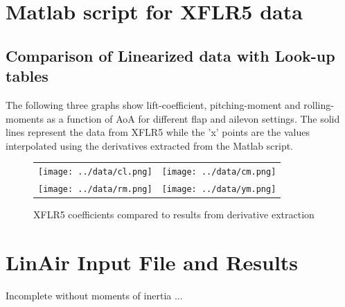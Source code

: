 \documentclass[titlepage,10pt]{article}
\begin{document}
\newpage
\section{Matlab script for XFLR5 data}
\subsection{Comparison of Linearized data with Look-up tables}
The following three graphs show lift-coefficient, pitching-moment and rolling-moments as a function of AoA for different flap and ailevon settings. The solid lines represent the data from XFLR5 while the 'x' points are the values interpolated using the derivatives extracted from the Matlab script.

\begin{figure}[hb]
\begin{center}
\begin{tabular}{cc}

\texttt{[image: ../data/cl.png]} & \texttt{[image: ../data/cm.png]} \\
\texttt{[image: ../data/rm.png]} & \texttt{[image: ../data/ym.png]} \\
\end{tabular}
\end{center}
\caption{XFLR5 coefficients compared to results from derivative extraction}
\end{figure}
\clearpage

\begin{footnotesize}\end{footnotesize}

\newpage
\section{LinAir Input File and Results}
Incomplete without moments of inertia ...
\end{document}
